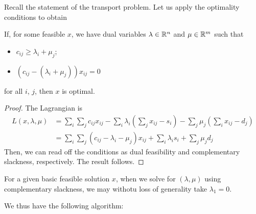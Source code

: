 \documentclass{../template/note}
\begin{document}
    Recall the statement of the transport problem. Let us apply the optimality conditions to obtain

    \begin{theorem}
        If, for some feasible $x$, we have dual variables $\lambda \in \mathbb R^n$ and $\mu \in \mathbb R^m$ such that
        \begin{itemize}
            \item $c_{ij} \geq \lambda_i + \mu_j$;
            \item $\left(c_{ij}-(\lambda_i+\mu_j)\right)x_{ij} = 0$
        \end{itemize}
        for all $i$, $j$, then $x$ is optimal.
    \end{theorem}
    
    \begin{proof}
        The Lagrangian is
        \begin{align*}
            L(x, \lambda, \mu) &= \sum_i \sum_j c_{ij}x_{ij} - \sum_i \lambda_i\left(\sum_j x_{ij}-s_i\right) - \sum_j \mu_j \left(\sum_i x_{ij} - d_j\right) \\
            &= \sum_i \sum_j \left(c_{ij}-\lambda_i-\mu_j\right)x_{ij} + \sum_i \lambda_i s_i + \sum_j \mu_j d_j
        \end{align*}
        Then, we can read off the conditions as dual feasibility and complementary slackness, respectively. The result follows.        
    \end{proof}
    
    \begin{remark*}
        For a given basic feasible solution $x$, when we solve for $(\lambda, \mu)$ using complementary slackness, we may withotu loss of generality take $\lambda_1 = 0$.
    \end{remark*}
    
    We thus have the following algorithm:
    
\end{document}
